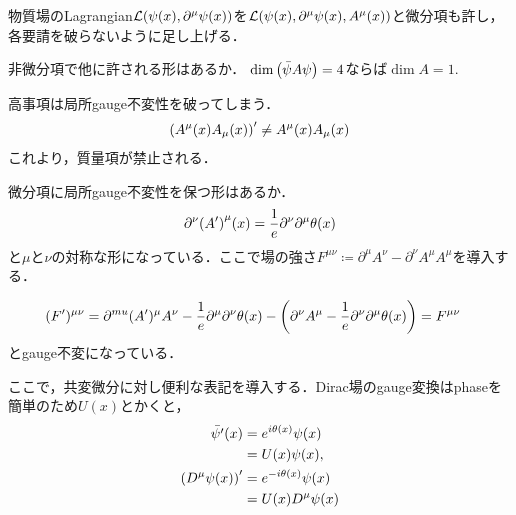 	物質場のLagrangian$\mathcal{L}(\psi(x), \partial^{\mu}\psi(x))$を$\mathcal{L}(\psi(x), \partial^{\mu}\psi(x), A^{\mu}(x))$と微分項も許し，各要請を破らないように足し上げる．

	非微分項で他に許される形はあるか．
	$\dim \qty(\bar{\psi}A \psi) = 4$ならば$\dim A =1$.

	高事項は局所gauge不変性を破ってしまう．
	\begin{align}
			\qty(A^{\mu}(x)A_{\mu}(x))' \neq A^{\mu}(x) A_{\mu}(x)
	\end{align}
	これより，質量項が禁止される．


	微分項に局所gauge不変性を保つ形はあるか．
	\begin{align}
			\partial^{\nu}\qty(A')^{\mu}(x)
			= \frac{1}{e}\partial^{\nu}\partial^{\mu}\theta(x)
	\end{align}
	と$\mu$と$\nu$の対称な形になっている．ここで場の強さ$F^{\mu\nu}\coloneqq \partial^{\mu}A^{\nu}- \partial^{\nu}A^{\mu}A^{\mu}$を導入する．

	\begin{align}
			(F')^{\mu\nu}
			&= \partial^{mu}(A')^{\mu}A^{\nu} - \frac{1}{e}\partial^{\mu}\partial^{\nu}\theta(x) - \qty(\partial^{\nu}A^{\mu} - \frac{1}{e}\partial^{\nu}\partial^{\mu}\theta(x)) = F^{\mu\nu}
	\end{align}
	とgauge不変になっている．

	ここで，共変微分に対し便利な表記を導入する．Dirac場のgauge変換はphaseを簡単のため$U(x)$とかくと，
	\begin{align}
			\bar{\psi'}(x) &= e^{i\theta(x)}\psi(x)\\
						   &= U(x)\psi(x),\\
			\qty(D^{\mu}\psi(x))'
						   &=e^{-i\theta(x)}\psi(x)\\
						   &= U(x)D^{\mu}\psi(x)
	\end{align}

